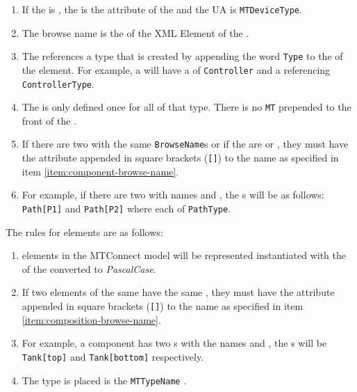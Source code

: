 \begin{enumerate}
\item If the  is , the  is the  attribute of the  and the UA  is \texttt{MTDeviceType}.
\item The browse name is the  of the XML Element of the . \label{item:component-browse-name}
\item The  references a type that is created by appending the word \texttt{Type} to the  of the  element. For example, a  will have a  of \texttt{Controller} and a  referencing \texttt{ControllerType}.
\item The  is only defined once for all  of that type. There is no \texttt{MT} prepended to the front of the  .
\item If there are two  with the same \texttt{BrowseName}s or if the  are  or , they must have the  attribute appended in square brackets (\texttt{[]}) to the name as specified in item \ref{item:component-browse-name}. 
\item For example, if there are two   with names  and , the s will be as follows: \texttt{Path[P1]} and \texttt{Path[P2]} where each  of \texttt{PathType}.
\end{enumerate}

The rules for  elements are as follows:

\begin{enumerate}
\item  {} elements in the MTConnect model will be represented instantiated with the  of the   converted to \textit{PascalCase}. \label{item:composition-browse-name}
\item If two  elements of the same  have the same , they must have the  attribute appended in square brackets (\texttt{[]}) to the name as specified in item \ref{item:composition-browse-name}.
\item For example, a component has two s with the names  and , the s will be \texttt{Tank[top]} and \texttt{Tank[bottom]} respectively.
\item The type is placed is the \texttt{MTTypeName} .
\end{enumerate}

